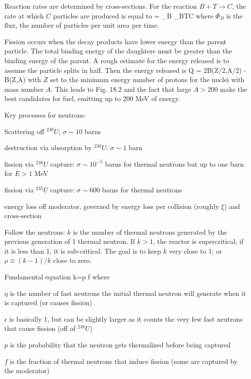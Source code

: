 \documentclass[11pt]{book}
\begin{document}



Reaction rates are determined by cross-sections. For the reaction $B+T\rightarrow C$, the rate at which $C$ particles are produced is equal to
\be
{} = \Phi_B \sigma_{BT\rightarrow C} \ee
where $\Phi_B$ is the flux, the number of particles per unit area per time. 

Fission occurs when the decay products have lower energy than the parent particle. The total binding energy of the daughters must be greater than the binding energy of the parent. A rough estimate for the energy released is to assume the particle splits in half. Then the energy released is
\be
Q = 2B(Z/2,A/2) - B(Z,A)
\ee
with $Z$ set to the minimum energy number of protons for the nuclei with mass number $A$. This leads to Fig. 18.2 and the fact that large $A>200$ make the best candidates for fuel, emitting up to 200 MeV of energy.

Key processes for neutrons:
\bei
\item Scattering off $^{238}U$; $\sigma\sim 10$ barns
\item destruction via absorption by $^{238}U$: $\sigma\sim 1$ barn
\item fission via $^{238}U$ capture: $\sigma\sim 10^{-5}$ barns for thermal neutrons but up to one barn for $E>1$ MeV
\item fission via $^{235}U$ capture: $\sigma\sim600$ barns for thermal neutrons
\item energy loss off moderator, governed by energy loss per collision (roughly $\xi$) and cross-section
\eei




Follow the neutrons: $k$ is the number of thermal neutrons generated by the previous generation of 1 thermal neutron. If $k>1$, the reactor is supercritical; if it is less than 1, it is sub-critical. The goal is to keep $k$ very close to 1; or $\rho\equiv (k-1)/k$ close to zero.

Fundamental equation
\be
k=\eta\epsilon p f
\ee
where
\bei
\item $\eta$ is the number of fast neutrons the initial thermal neutron will generate when it is captured (or causes fission)
\item $\epsilon$ is basically 1, but can be slightly larger as it counts the very few fast neutrons that cause fission (off of $^{238}U$)
\item $p$ is the probability that the neutron gets thermalized before being captured 
\item $f$ is the fraction of thermal neutrons that induce fission (some are captured by the moderator)
\eei
\end{document}
